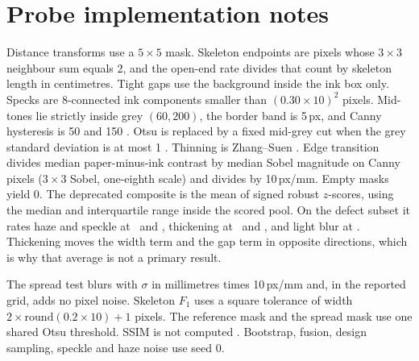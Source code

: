 \section{Probe implementation notes}
\label{app:probes}

Distance transforms use a $5{\times}5$ mask.
Skeleton endpoints are pixels whose $3{\times}3$ neighbour sum equals 2, and the open-end rate divides that count by skeleton length in centimetres.
Tight gaps use the background inside the ink box only.
Specks are 8-connected ink components smaller than $(0.30 \times 10)^2$ pixels.
Mid-tones lie strictly inside grey $(60, 200)$, the border band is 5\,px, and Canny hysteresis is 50 and 150 \citep{canny1986}.
Otsu is replaced by a fixed mid-grey cut when the grey standard deviation is at most 1 \citep{otsu1979}.
Thinning is Zhang--Suen \citep{zhang1984thinning}.
Edge transition divides median paper-minus-ink contrast by median Sobel magnitude on Canny pixels ($3{\times}3$ Sobel, one-eighth scale) and divides by 10\,px/mm.
Empty masks yield 0.
The deprecated composite is the mean of signed robust $z$-scores, using the median and interquartile range inside the scored pool.
On the defect subset it rates haze and speckle at \DgProbecompositefiveHazeOne\ and \DgProbecompositefiveSpeckleOne, thickening at \DgProbecompositefiveThickenOne\ and \DgProbecompositefiveThickenTwo, and light blur at \DgProbecompositefiveBlurOne.
Thickening moves the width term and the gap term in opposite directions, which is why that average is not a primary result.

The spread test blurs with $\sigma$ in millimetres times 10\,px/mm and, in the reported grid, adds no pixel noise.
Skeleton $F_1$ uses a square tolerance of width $2 \times \mathrm{round}(0.2 \times 10) + 1$ pixels.
The reference mask and the spread mask use one shared Otsu threshold.
SSIM is not computed \citep{wang2004ssim}.
Bootstrap, fusion, design sampling, speckle and haze noise use seed 0.
